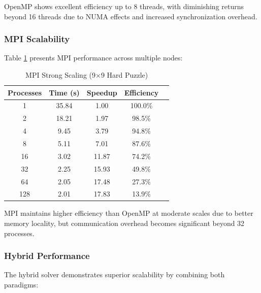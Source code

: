 OpenMP shows excellent efficiency up to 8 threads, with diminishing returns beyond 16 threads due to NUMA effects and increased synchronization overhead.

\subsubsection{MPI Scalability}
Table \ref{tab:mpi_scaling} presents MPI performance across multiple nodes:

\begin{table}[htbp]
\caption{MPI Strong Scaling (9×9 Hard Puzzle)}
\begin{center}
\begin{tabular}{@{}ccccc@{}}
\toprule
\textbf{Processes} & \textbf{Time (s)} & \textbf{Speedup} & \textbf{Efficiency} \\
\midrule
1 & 35.84 & 1.00 & 100.0\% \\
2 & 18.21 & 1.97 & 98.5\% \\
4 & 9.45 & 3.79 & 94.8\% \\
8 & 5.11 & 7.01 & 87.6\% \\
16 & 3.02 & 11.87 & 74.2\% \\
32 & 2.25 & 15.93 & 49.8\% \\
64 & 2.05 & 17.48 & 27.3\% \\
128 & 2.01 & 17.83 & 13.9\% \\
\bottomrule
\end{tabular}
\end{center}
\label{tab:mpi_scaling}
\end{table}

MPI maintains higher efficiency than OpenMP at moderate scales due to better memory locality, but communication overhead becomes significant beyond 32 processes.

\subsubsection{Hybrid Performance}
The hybrid solver demonstrates superior scalability by combining both paradigms:

